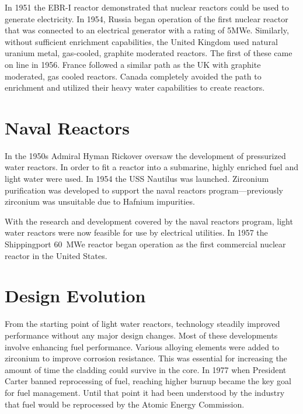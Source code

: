 
In 1951 the EBR-I reactor demonstrated that nuclear reactors could be used to generate electricity. %
In 1954, Russia began operation of the first nuclear reactor that was connected to an electrical generator with a rating of 5MWe.
Similarly, without sufficient enrichment capabilities, the United Kingdom used natural uranium metal, gas-cooled, graphite moderated reactors. The first of these came on line in 1956.
France followed a similar path as the UK with graphite moderated, gas cooled reactors. 
Canada completely avoided the path to enrichment and utilized their heavy water capabilities to create reactors. 

\section{Naval Reactors}
In the 1950s Admiral Hyman Rickover oversaw the development of pressurized water reactors. In order to fit a reactor into a submarine, highly enriched fuel and light water were used. In 1954 the USS Nautilus was launched. Zirconium purification was developed to support the naval reactors program---previously zirconium was unsuitable due to Hafnium impurities. 

With the research and development covered by the naval reactors program, light water reactors were now feasible for use by electrical utilities. In 1957 the Shippingport 60~MWe reactor began operation as the first commercial nuclear reactor in the United States. %

\section{Design Evolution}
From the starting point of light water reactors, technology steadily improved performance without any major design changes. Most of these developments involve enhancing fuel performance. 
Various alloying elements were added to zirconium to improve corrosion resistance. This was essential for increasing the amount of time the cladding could survive in the core. 
In 1977 when President Carter banned reprocessing of fuel, reaching higher burnup became the key goal for fuel management. Until that point it had been understood by the industry that fuel would be reprocessed by the Atomic Energy Commission.

